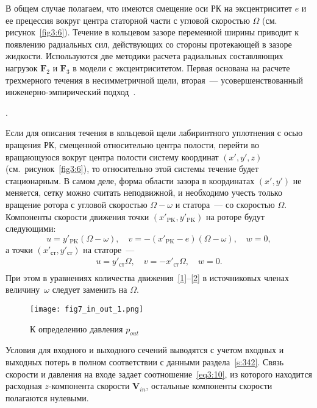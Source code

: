 В общем случае полагаем, что имеются смещение оси РК на эксцентриситет $e$ и ее прецессия вокруг центра 
статорной части с угловой скоростью $\Omega$ (см. рисунок~\ref{fig3:6}). Течение в кольцевом зазоре
переменной ширины приводит к появлению радиальных сил, действующих со стороны протекающей в зазоре жидкости. 
Используются две методики расчета радиальных составляющих нагрузок $\textbf{F}_2$ и $\textbf{F}_3$ в модели с
эксцентриситетом. Первая основана на расчете трехмерного течения в несимметричной щели, 
вторая~--- усовершенствованный инженерно-эмпирический подход~\cite{lomakin}.

\bigskip
{}.
\label{s:3431}
\medskip

\noindent Если для описания течения в кольцевой щели лабиринтного уплотнения с осью вращения РК, 
смещенной относительно центра полости, перейти во вращающуюся вокруг центра полости систему 
координат $(x',y',z)$ (см.~рисунок~\ref{fig3:6}),
то относительно этой системы   течение будет стационарным. В самом деле, форма области зазора в 
координатах $(x',y')$ не меняется, сетку можно считать неподвижной, и необходимо  учесть только вращение 
ротора с угловой скоростью $\Omega - \omega$ и статора~--- со скоростью $\Omega$. Компоненты скорости 
движения точки $(x'_{\text{PK}},y'_{\text{PK}})$ на роторе будут следующими:
\begin{equation}
    u = y'_{\text{PK}}\left( {\Omega  - \omega } \right), \quad
    v =  - \left( {x'_{\text{PK}} - e} \right)\left( {\Omega  - \omega } \right), \quad
    w = 0,
   \label{eq3:15}
\end{equation}
а точки $(x'_{\text{ст}},y'_{\text{ст}})$ на статоре~---
\begin{equation}
  \begin{array}{l}
    u = y'_{\text{ст}}\Omega , \quad
    v =  - x'_{\text{ст}}\Omega , \quad
    w = 0. \\
  \end{array}
  \label{eq3:16}
\end{equation}
При этом в уравнениях количества движения~\eqref{1}--\eqref{2} в источниковых членах 
величину~$\omega$ следует заменить на $\Omega$.
\begin{figure}[t!]
  \centering \texttt{[image: fig7\_in\_out\_1.png]}
  \caption{К определению давления $p_{out}$}
  \label{fig3:7}
\end{figure}
Условия для входного и выходного сечений выводятся с
учетом входных и выходных потерь в полном соответствии с данными раздела~\ref{s:342}.
Связь скорости и давления на входе задает соотношение~\eqref{eq3:10}, из которого
 находится расходная $z$-компонента скорости $\textbf{V}_{in}$, остальные
компоненты скорости полагаются нулевыми.

